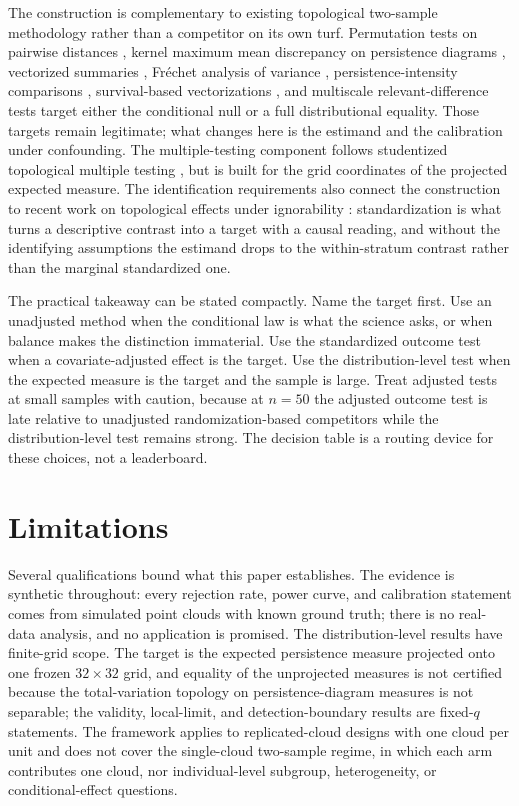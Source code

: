 The construction is complementary to existing topological two-sample methodology rather than a competitor on its own turf. Permutation tests on pairwise distances \cite{robinson_turner_2017}, kernel maximum mean discrepancy on persistence diagrams \cite{kwitt_neurips_2015,gretton_2012}, vectorized summaries \cite{moon_lazar_2023,islambekov_pathirana_2024}, Fr\'echet analysis of variance \cite{dubey_muller_2019}, persistence-intensity comparisons \cite{han_kim_kim_2026}, survival-based vectorizations \cite{murris_strand_2026}, and multiscale relevant-difference tests \cite{krebs_rademacher_2024} target either the conditional null or a full distributional equality. Those targets remain legitimate; what changes here is the estimand and the calibration under confounding. The multiple-testing component follows studentized topological multiple testing \cite{vejdemo_mukherjee_2022}, but is built for the grid coordinates of the projected expected measure. The identification requirements also connect the construction to recent work on topological effects under ignorability \cite{kim_lee_tce_2026,souto_diamantis_tcda_2026,saki_faghihi_2026}: standardization is what turns a descriptive contrast into a target with a causal reading, and without the identifying assumptions the estimand drops to the within-stratum contrast rather than the marginal standardized one.

The practical takeaway can be stated compactly. Name the target first. Use an unadjusted method when the conditional law is what the science asks, or when balance makes the distinction immaterial. Use the standardized outcome test when a covariate-adjusted effect is the target. Use the distribution-level test when the expected measure is the target and the sample is large. Treat adjusted tests at small samples with caution, because at $n=50$ the adjusted outcome test is late relative to unadjusted randomization-based competitors while the distribution-level test remains strong. The decision table is a routing device for these choices, not a leaderboard.

\section{Limitations}

Several qualifications bound what this paper establishes. The evidence is synthetic throughout: every rejection rate, power curve, and calibration statement comes from simulated point clouds with known ground truth; there is no real-data analysis, and no application is promised. The distribution-level results have finite-grid scope. The target is the expected persistence measure projected onto one frozen $32 \times 32$ grid, and equality of the unprojected measures is not certified because the total-variation topology on persistence-diagram measures is not separable; the validity, local-limit, and detection-boundary results are fixed-$q$ statements. The framework applies to replicated-cloud designs with one cloud per unit and does not cover the single-cloud two-sample regime, in which each arm contributes one cloud, nor individual-level subgroup, heterogeneity, or conditional-effect questions.


